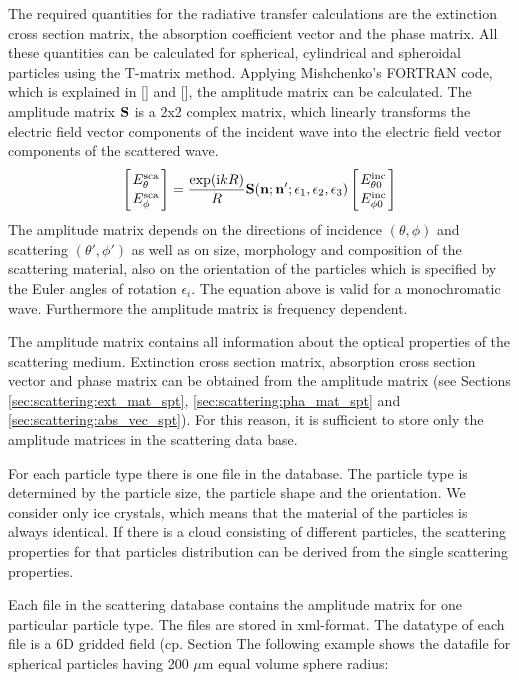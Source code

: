 \label{sec:scattering:amp_mat_data}

The required quantities for the radiative transfer calculations are
the  extinction cross section matrix, the
absorption coefficient vector and the phase
matrix. All these quantities can be calculated for spherical,
cylindrical and spheroidal particles using the T-matrix
method. Applying Mishchenko's FORTRAN code, which is explained in
[\cite{Mishchenko:98}] and [\cite{Mishchenko:00}],   
the amplitude matrix can be calculated. The
amplitude matrix ${\bf S}$ is a 2x2 complex matrix, which linearly transforms 
the electric field vector components of the incident wave into the
electric field vector components of the scattered wave.  
\begin{eqnarray}
  \label{eq:ampl_matrix}
  \left[{E^{\rm sca}_{\theta}\atop E^{\rm sca}_{\phi}}\right] =
  \frac{\exp({\rm i} kR)}{R}{\bf S}({\bf n};{\bf
      n'};\epsilon_1,\epsilon_2,\epsilon_3)\left[{E^{\rm inc}_{\theta
          0}\atop E^{\rm inc}_{\phi 0}}\right] 
\end{eqnarray}
The amplitude matrix depends on the directions of incidence  $(\theta,
\phi)$  and
scattering $(\theta', \phi')$ as  well as on size, morphology and composition of the
scattering material, also on the orientation of the particles which
is specified by the Euler angles of rotation $\epsilon _i$. 
The equation above is valid for a monochromatic wave.  Furthermore the
amplitude matrix is frequency dependent.

The amplitude matrix contains all information about the optical
properties of the scattering medium. Extinction cross section
matrix, absorption cross section vector and phase matrix can be
obtained from the amplitude matrix (see Sections
\ref{sec:scattering:ext_mat_spt}, \ref{sec:scattering:pha_mat_spt}  and
\ref{sec:scattering:abs_vec_spt}).
For this reason, it is sufficient to store only the amplitude matrices
in the scattering data base. 

For each particle type there is one file in the database.
The particle type is determined by the particle size, the particle
shape and the
orientation. We consider only ice crystals, which means that the
material of the
particles is always identical. If there is a cloud consisting of
different particles, the scattering properties for that particles
distribution can be derived from the single scattering properties.

Each file in the scattering database contains the amplitude matrix for
one particular particle type. The files are stored in xml-format. The
datatype of each file is a 6D gridded field (cp. Section
The following example shows the datafile
for spherical particles having 200 $\mu$m equal volume sphere radius:

